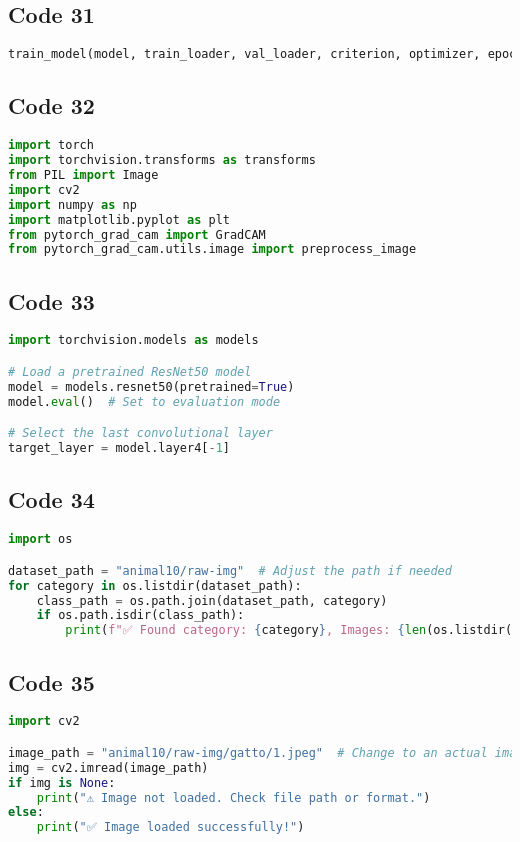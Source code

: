 \documentclass{article}
\begin{document}
\subsection*{Code 31}
\begin{lstlisting}[language=Python]
train_model(model, train_loader, val_loader, criterion, optimizer, epochs=5)

\end{lstlisting}

\subsection*{Code 32}
\begin{lstlisting}[language=Python]
import torch
import torchvision.transforms as transforms
from PIL import Image
import cv2
import numpy as np
import matplotlib.pyplot as plt
from pytorch_grad_cam import GradCAM
from pytorch_grad_cam.utils.image import preprocess_image

\end{lstlisting}

\subsection*{Code 33}
\begin{lstlisting}[language=Python]
import torchvision.models as models

# Load a pretrained ResNet50 model
model = models.resnet50(pretrained=True)
model.eval()  # Set to evaluation mode

# Select the last convolutional layer
target_layer = model.layer4[-1]

\end{lstlisting}

\subsection*{Code 34}
\begin{lstlisting}[language=Python]
import os

dataset_path = "animal10/raw-img"  # Adjust the path if needed
for category in os.listdir(dataset_path):
    class_path = os.path.join(dataset_path, category)
    if os.path.isdir(class_path):
        print(f"✅ Found category: {category}, Images: {len(os.listdir(class_path))}")

\end{lstlisting}

\subsection*{Code 35}
\begin{lstlisting}[language=Python]
import cv2

image_path = "animal10/raw-img/gatto/1.jpeg"  # Change to an actual image
img = cv2.imread(image_path)
if img is None:
    print("⚠️ Image not loaded. Check file path or format.")
else:
    print("✅ Image loaded successfully!")

\end{lstlisting}
\end{document}
